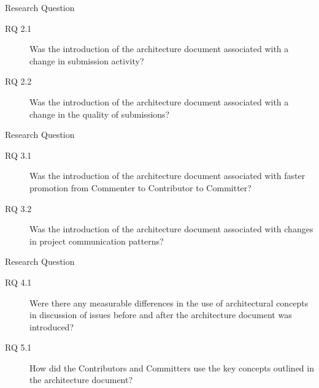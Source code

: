 \documentclass[t,14pt,mathserif]{beamer}
\begin{document}
\begin{frame}{Research Question}
	
	\begin{description}
		\item[RQ 2.1] Was the introduction of the architecture document associated with a change in submission activity?
		\item[RQ 2.2] Was the introduction of the architecture document associated with a change in the quality of submissions?
	\end{description}
	
\end{frame}


\begin{frame}{Research Question}
	
	\begin{description}
		\item[RQ 3.1] Was the introduction of the architecture document associated with faster promotion from Commenter to Contributor to Committer?
		\item[RQ 3.2] Was the introduction of the architecture document associated with changes in project communication patterns?
	\end{description}
	
\end{frame}


\begin{frame}{Research Question}
	
	\begin{description}
		\item[RQ 4.1]  Were there any measurable differences in the use of architectural concepts in discussion of issues before and after the architecture document was introduced?
		\item[RQ 5.1] How did the Contributors and Committers use the key concepts outlined in the architecture document?
	\end{description}
	
\end{frame}
\end{document}
